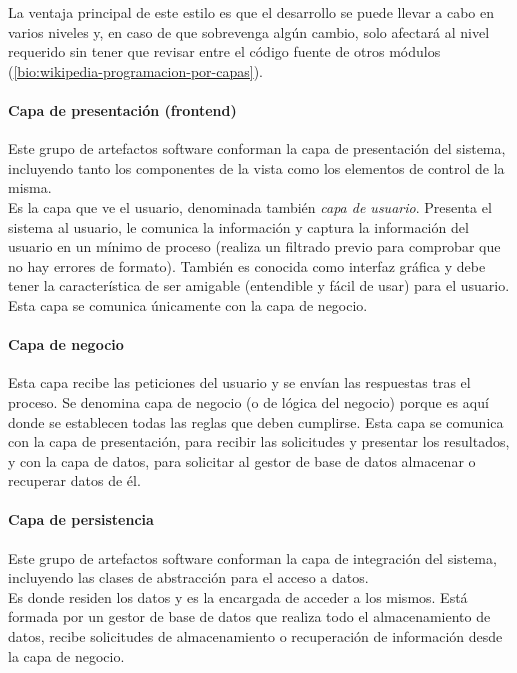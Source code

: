 La ventaja principal de este estilo es que el desarrollo se puede llevar a cabo en varios niveles y, en caso de que sobrevenga algún cambio, solo afectará al nivel requerido sin tener que revisar entre el código fuente de otros módulos (\ref{bio:wikipedia-programacion-por-capas}).

\paragraph*{Capa de presentación (frontend)}

Este grupo de artefactos software conforman la capa de presentación del sistema, incluyendo tanto los componentes de la vista como los elementos de control de la misma. \\

Es la capa que ve el usuario, denominada también \textit{capa de usuario}. Presenta el sistema al usuario, le comunica la información y captura la información del usuario en un mínimo de proceso (realiza un filtrado previo para comprobar que no hay errores de formato). También es conocida como interfaz gráfica y debe tener la característica de ser amigable (entendible y fácil de usar) para el usuario. Esta capa se comunica únicamente con la capa de negocio.

\paragraph*{Capa de negocio}

Esta capa recibe las peticiones del usuario y se envían las respuestas tras el proceso. Se denomina capa de negocio (o de lógica del negocio) porque es aquí donde se establecen todas las reglas que deben cumplirse. Esta capa se comunica con la capa de presentación, para recibir las solicitudes y presentar los resultados, y con la capa de datos, para solicitar al gestor de base de datos almacenar o recuperar datos de él. 

\paragraph*{Capa de persistencia}

Este grupo de artefactos software conforman la capa de integración del sistema, incluyendo las clases de abstracción para el acceso a datos.\\

Es donde residen los datos y es la encargada de acceder a los mismos. Está formada por un gestor de base de datos que realiza todo el almacenamiento de datos, recibe solicitudes de almacenamiento o recuperación de información desde la capa de negocio.\\

